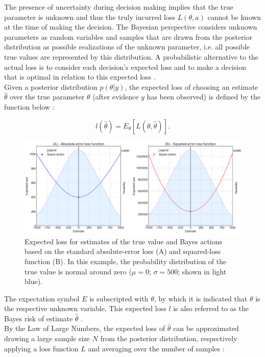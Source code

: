         The presence of uncertainty during decision making implies that the true parameter is unknown and thus the truly incurred loss $L(\theta,a)$ cannot be known at the time of making the decision. The Bayesian perspective considers unknown parameters as random variables and samples that are drawn from the posterior distribution as possible realizations of the unknown parameter, i.e. all possible true values are represented by this distribution. A probabilistic alternative to the actual loss is to consider each decision's expected loss and to make a decision that is optimal in relation to this expected loss \citep{berger2013stat, davidson2015}.\\        
        Given a posterior distribution $p(\theta|y)$, the expected loss of choosing an estimate $\hat{\theta}$ over the true parameter $\theta$ (after evidence $y$ has been observed) is defined by the function below \citep{davidson2015}:
        
        \begin{equation}\label{eq:ExpectedLoss}
        l(\hat{\theta}) = E_{\theta}[L(\theta,\hat{\theta})].
        \end{equation}  
        
        \begin{figure}[h]
        	\centering
        	\includegraphics[width=1\textwidth]{Figures/loss_functions2.png}
        	\caption{Expected loss for estimates of the true value and Bayes actions based on the standard absolute-error loss (A) and squared-loss function (B). In this example, the probability distribution of the true value is normal around zero ($\mu = 0$; $\sigma = 500$; shown in light blue).}\label{fig:standard_LF} 
        \end{figure}
        
        The expectation symbol $E$ is subscripted with $\theta$, by which it is indicated that $\theta$ is the respective unknown variable. This expected loss $l$ is also referred to as the Bayes risk of estimate $\hat{\theta}$ \citep{berger2013stat, davidson2015}.\\        
        By the Law of Large Numbers, the expected loss of $\hat{\theta}$ can be approximated drawing a large sample size $N$ from the posterior distribution, respectively applying a loss function $L$ and averaging over the number of samples \citep{davidson2015}:
        
